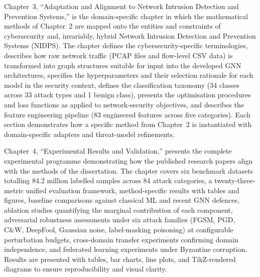 Chapter~3, ``Adaptation and Alignment to Network Intrusion Detection and Prevention Systems,'' is the domain-specific chapter in which the mathematical methods of Chapter~2 are mapped onto the entities and constraints of cybersecurity and, invariably, hybrid Network Intrusion Detection and Prevention Systems (NIDPS). The chapter defines the cybersecurity-specific terminologies, describes how raw network traffic (PCAP files and flow-level CSV data) is transformed into graph structures suitable for input into the developed GNN architectures, specifies the hyperparameters and their selection rationale for each model in the security context, defines the classification taxonomy (34 classes across 33 attack types and 1 benign class), presents the optimisation procedures and loss functions as applied to network-security objectives, and describes the feature engineering pipeline (83 engineered features across five categories). Each section demonstrates how a specific method from Chapter~2 is instantiated with domain-specific adapters and threat-model refinements.

Chapter~4, ``Experimental Results and Validation,'' presents the complete experimental programme demonstrating how the published research papers align with the methods of the dissertation. The chapter covers six benchmark datasets totalling 84.2 million labelled samples across 84 attack categories, a twenty-three-metric unified evaluation framework, method-specific results with tables and figures, baseline comparisons against classical ML and recent GNN defences, ablation studies quantifying the marginal contribution of each component, adversarial robustness assessments under six attack families (FGSM, PGD, C\&W, DeepFool, Gaussian noise, label-masking poisoning) at configurable perturbation budgets, cross-domain transfer experiments confirming domain independence, and federated learning experiments under Byzantine corruption. Results are presented with tables, bar charts, line plots, and TikZ-rendered diagrams to ensure reproducibility and visual clarity.

